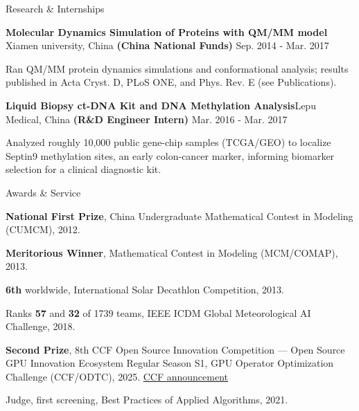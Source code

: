 \documentclass{resume} %
\begin{document}
\begin{rSection}{Research \& Internships}
\begin{rSubsection}{\bf Molecular Dynamics Simulation of Proteins with QM/MM model  }{Xiamen university, China}
{\bf (China National Funds) }{Sep. 2014 - Mar. 2017}
  \item {Ran QM/MM protein dynamics simulations and conformational analysis; results published in Acta Cryst. D, PLoS ONE, and Phys. Rev. E (see Publications).}\\
\end{rSubsection}

\begin{rSubsection}{\bf Liquid Biopsy ct-DNA Kit and DNA Methylation Analysis}{Lepu Medical, China}
{\bf (R\&D Engineer Intern) }{Mar. 2016 - Mar. 2017}
  \item {Analyzed roughly 10,000 public gene-chip samples (TCGA/GEO) to localize Septin9 methylation sites, an early colon-cancer marker, informing biomarker selection for a clinical diagnostic kit.}\\
\end{rSubsection}

\end{rSection}

\begin{rSection}{Awards \& Service}

\begin{rSubsection}{}{}
{}{}
  \item {{\bf National First Prize}, China Undergraduate Mathematical Contest in Modeling (CUMCM), 2012.}\\
  \item {{\bf Meritorious Winner}, Mathematical Contest in Modeling (MCM/COMAP), 2013.}\\
  \item {{\bf 6th} worldwide, International Solar Decathlon Competition, 2013.}\\
  \item {Ranks {\bf 57} and {\bf 32} of 1739 teams, IEEE ICDM Global Meteorological AI Challenge, 2018.}\\
  \item {{\bf Second Prize}, 8th CCF Open Source Innovation Competition — Open Source GPU Innovation Ecosystem Regular Season S1, GPU Operator Optimization Challenge (CCF/ODTC), 2025. \href{https://www.ccf.org.cn/Media_list/ccfosc/2025-12-26/855561.shtml}{\small CCF announcement}}\\
  \item {Judge, first screening, Best Practices of Applied Algorithms, 2021.}\\
\end{rSubsection}

\end{rSection}
\end{document}
